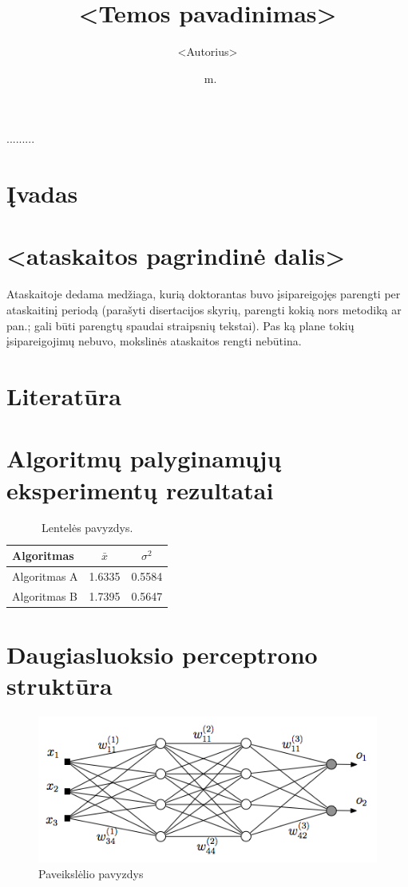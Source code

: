 \documentclass[11pt, a4paper, lithuanian]{article}
\date{\the\year\ m.\monthlt[\month]}
\title{<Temos pavadinimas>}
\author{<Autorius>}
\begin{document}
\maketitle

.........


\tableofcontents

\section{Įvadas}

\section{<ataskaitos pagrindinė dalis>}
Ataskaitoje dedama medžiaga, kurią doktorantas buvo įsipareigojęs parengti per
ataskaitinį periodą (parašyti disertacijos skyrių, parengti kokią nors metodiką
ar pan.; gali būti parengtų spaudai straipsnių tekstai). Pas ką plane tokių
įsipareigojimų nebuvo, mokslinės ataskaitos rengti nebūtina.

\section{Literatūra}

\appendix
\section{Algoritmų palyginamųjų eksperimentų rezultatai}
\begin{table}[H]
  \centering
  \caption{Lentelės pavyzdys.}
  {\begin{tabular}{|l|c|c|} \hline
    Algoritmas    & $\bar{x}$ & $\sigma^{2}$ \\
    \hline
    Algoritmas A  & 1.6335    & 0.5584       \\
    Algoritmas B  & 1.7395    & 0.5647       \\
    \hline
  \end{tabular}}
  \label{tab:table example}
\end{table}

\section{Daugiasluoksio perceptrono struktūra}
\begin{figure}[H]
    \centering
\includegraphics[scale=0.5]{img/MLP}
\caption{Paveikslėlio pavyzdys}
\end{figure}

% 
\end{document}
